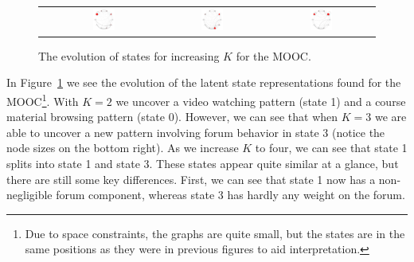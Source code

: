 \begin{figure}
\begin{tabular}{cccc}
    &
    \includegraphics[width=0.22\textwidth]{figures/text-4state/state1.png}
    &
    \includegraphics[width=0.22\textwidth]{figures/text-4state/state2.png}
    &
    \includegraphics[width=0.22\textwidth]{figures/text-4state/state3.png}
  \end{tabular}
  \caption{The evolution of states for increasing $K$ for the
  \protect\textretrieval{} MOOC.} %
  \label{fig:text-state-evolution}
\end{figure}

In Figure~\ref{fig:text-state-evolution} we see the evolution of the latent
state representations found for the \textretrieval{} MOOC\footnote{Due to
space constraints, the graphs are quite small, but the states are in the
same positions as they were in previous figures to aid interpretation.}.
With $K=2$ we uncover a video watching pattern (state 1) and a course
material browsing pattern (state 0). However, we can see that when $K=3$ we
are able to uncover a new pattern involving forum behavior in state 3
(notice the node sizes on the bottom right). As we increase $K$ to four, we
can see that state 1 splits into state 1 and state 3. These states appear
quite similar at a glance, but there are still some key differences. First,
we can see that state 1 now has a non-negligible forum component, whereas
state 3 has hardly any weight on the forum.


